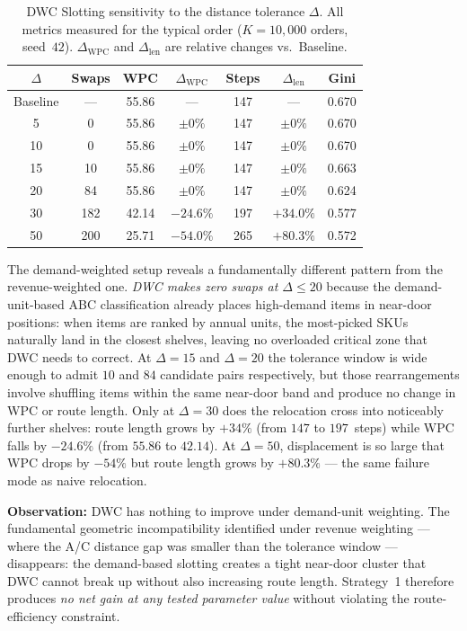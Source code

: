 \documentclass[12pt,a4paper]{article}
\begin{document}
\begin{table}[H]
\centering
\caption{DWC Slotting sensitivity to the distance tolerance $\Delta$.
  All metrics measured for the typical order ($K=10{,}000$ orders, seed~$42$).
  $\Delta_\mathrm{WPC}$ and $\Delta_\mathrm{len}$ are relative changes vs.\ Baseline.}
\label{tab:dwc_delta}
\renewcommand{\arraystretch}{1.20}
\begin{tabular}{ccccccc}
\hline
$\Delta$ & Swaps & WPC & $\Delta_\mathrm{WPC}$ & Steps & $\Delta_\mathrm{len}$ & Gini \\
\hline
Baseline & --- & 55.86 & ---         & 147 & ---        & 0.670 \\
5        & 0   & 55.86 & $\pm0\%$   & 147 & $\pm0\%$  & 0.670 \\
10       & 0   & 55.86 & $\pm0\%$   & 147 & $\pm0\%$  & 0.670 \\
15       & 10  & 55.86 & $\pm0\%$   & 147 & $\pm0\%$  & 0.663 \\
20       & 84  & 55.86 & $\pm0\%$   & 147 & $\pm0\%$  & 0.624 \\
30       & 182 & 42.14 & $-24.6\%$  & 197 & $+34.0\%$ & 0.577 \\
50       & 200 & 25.71 & $-54.0\%$  & 265 & $+80.3\%$ & 0.572 \\
\hline
\end{tabular}
\end{table}

The demand-weighted setup reveals a fundamentally different pattern from the
revenue-weighted one.
\emph{DWC makes zero swaps at $\Delta \le 20$} because the demand-unit-based
ABC classification already places high-demand items in near-door positions:
when items are ranked by annual units, the most-picked SKUs naturally land
in the closest shelves, leaving no overloaded critical zone that DWC needs to
correct.
At $\Delta = 15$ and $\Delta = 20$ the tolerance window is wide enough to admit
$10$ and $84$ candidate pairs respectively, but those rearrangements involve
shuffling items within the same near-door band and produce no change in WPC or
route length.
Only at $\Delta = 30$ does the relocation cross into noticeably further shelves:
route length grows by $+34\%$ (from $147$ to $197$~steps) while WPC falls by
$-24.6\%$ (from $55.86$ to $42.14$).
At $\Delta = 50$, displacement is so large that WPC drops by $-54\%$ but route
length grows by $+80.3\%$ --- the same failure mode as naive relocation.

\textbf{Observation:} DWC has nothing to improve under demand-unit weighting.
The fundamental geometric incompatibility identified under revenue weighting ---
where the A/C distance gap was smaller than the tolerance window --- disappears:
the demand-based slotting creates a tight near-door cluster that DWC cannot
break up without also increasing route length.
Strategy~1 therefore produces \emph{no net gain at any tested parameter value}
without violating the route-efficiency constraint.
\end{document}
